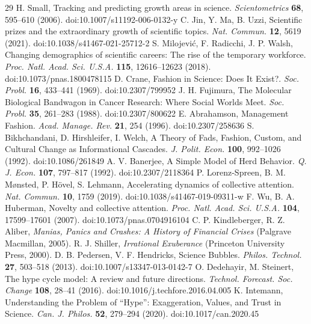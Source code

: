 \begin{thebibliography}{29}
 H. Small, Tracking and predicting growth areas in science. \textit{Scientometrics} \textbf{68}, 595–610 (2006). doi:10.1007/s11192-006-0132-y
 C. Jin, Y. Ma, B. Uzzi, Scientific prizes and the extraordinary growth of scientific topics. \textit{Nat. Commun.} \textbf{12}, 5619 (2021). doi:10.1038/s41467-021-25712-2
 S. Milojević, F. Radicchi, J. P. Walsh, Changing demographics of scientific careers: The rise of the temporary workforce. \textit{Proc. Natl. Acad. Sci. U.S.A.} \textbf{115}, 12616–12623 (2018). doi:10.1073/pnas.1800478115
 D. Crane, Fashion in Science: Does It Exist?. \textit{Soc. Probl.} \textbf{16}, 433–441 (1969). doi:10.2307/799952
 J. H. Fujimura, The Molecular Biological Bandwagon in Cancer Research: Where Social Worlds Meet. \textit{Soc. Probl.} \textbf{35}, 261–283 (1988). doi:10.2307/800622
 E. Abrahamson, Management Fashion. \textit{Acad. Manage. Rev.} \textbf{21}, 254 (1996). doi:10.2307/258636
 S. Bikhchandani, D. Hirshleifer, I. Welch, A Theory of Fads, Fashion, Custom, and Cultural Change as Informational Cascades. \textit{J. Polit. Econ.} \textbf{100}, 992–1026 (1992). doi:10.1086/261849
 A. V. Banerjee, A Simple Model of Herd Behavior. \textit{Q. J. Econ.} \textbf{107}, 797–817 (1992). doi:10.2307/2118364
 P. Lorenz-Spreen, B. M. Mønsted, P. Hövel, S. Lehmann, Accelerating dynamics of collective attention. \textit{Nat. Commun.} \textbf{10}, 1759 (2019). doi:10.1038/s41467-019-09311-w
 F. Wu, B. A. Huberman, Novelty and collective attention. \textit{Proc. Natl. Acad. Sci. U.S.A.} \textbf{104}, 17599–17601 (2007). doi:10.1073/pnas.0704916104
 C. P. Kindleberger, R. Z. Aliber, \textit{Manias, Panics and Crashes: A History of Financial Crises} (Palgrave Macmillan, 2005).
 R. J. Shiller, \textit{Irrational Exuberance} (Princeton University Press, 2000).
 D. B. Pedersen, V. F. Hendricks, Science Bubbles. \textit{Philos. Technol.} \textbf{27}, 503–518 (2013). doi:10.1007/s13347-013-0142-7
 O. Dedehayir, M. Steinert, The hype cycle model: A review and future directions. \textit{Technol. Forecast. Soc. Change} \textbf{108}, 28–41 (2016). doi:10.1016/j.techfore.2016.04.005
 K. Intemann, Understanding the Problem of “Hype”: Exaggeration, Values, and Trust in Science. \textit{Can. J. Philos.} \textbf{52}, 279–294 (2020). doi:10.1017/can.2020.45

\end{thebibliography}

